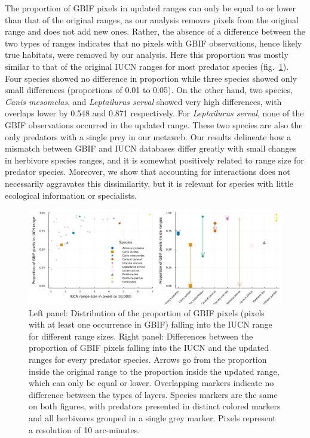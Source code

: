 \documentclass[10pt,oneside]{article}
\makeatletter
\def\maxwidth{\ifdim\Gin@nat@width>\linewidth\linewidth
\else\Gin@nat@width\fi}
\let\Oldincludegraphics\includegraphics
\renewcommand{\includegraphics}[1]{\Oldincludegraphics[width=\maxwidth]{#1}}
\makeatother
\begin{document}
The proportion of GBIF pixels in updated ranges can only be equal to or
lower than that of the original ranges, as our analysis removes pixels
from the original range and does not add new ones. Rather, the absence
of a difference between the two types of ranges indicates that no pixels
with GBIF observations, hence likely true habitats, were removed by our
analysis. Here this proportion was mostly similar to that of the
original IUCN ranges for most predator species (fig.~\ref{fig:gbif}).
Four species showed no difference in proportion while three species
showed only small differences (proportions of 0.01 to 0.05). On the
other hand, two species, \emph{Canis mesomelas}, and \emph{Leptailurus
serval} showed very high differences, with overlaps lower by 0.548 and
0.871 respectively. For \emph{Leptailurus serval}, none of the GBIF
observations occurred in the updated range. These two species are also
the only predators with a single prey in our metaweb. Our results
delineate how a mismatch between GBIF and IUCN databases differ greatly
with small changes in herbivore species ranges, and it is somewhat
positively related to range size for predator species. Moreover, we show
that accounting for interactions does not necessarily aggravates this
dissimilarity, but it is relevant for species with little ecological
information or specialists.

\begin{figure}
\hypertarget{fig:gbif}{%
\centering
\includegraphics{figures/gbif_panels.png}
\caption{Left panel: Distribution of the proportion of GBIF pixels
(pixels with at least one occurrence in GBIF) falling into the IUCN
range for different range sizes. Right panel: Differences between the
proportion of GBIF pixels falling into the IUCN and the updated ranges
for every predator species. Arrows go from the proportion inside the
original range to the proportion inside the updated range, which can
only be equal or lower. Overlapping markers indicate no difference
between the types of layers. Species markers are the same on both
figures, with predators presented in distinct colored markers and all
herbivores grouped in a single grey marker. Pixels represent a
resolution of 10 arc-minutes.}\label{fig:gbif}
}
\end{figure}
\end{document}
